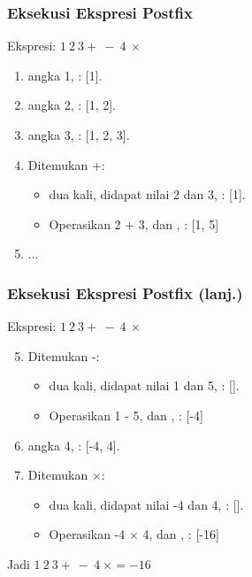 \begin{frame}
\frametitle{Eksekusi Ekspresi Postfix}
Ekspresi: $1 \ 2 \ 3 + \ - \ 4 \ \times$
\begin{enumerate}
  \item {} angka 1, : [1].
  \item {} angka 2, : [1, 2].
  \item {} angka 3, : [1, 2, 3].
  \item Ditemukan +:
  \begin{itemize}
    \item {} dua kali, didapat nilai 2 dan 3, : [1].
    \item Operasikan 2 + 3, dan , : [1, 5]
  \end{itemize}
  \item ...
\end{enumerate}
\end{frame}

\begin{frame}
\frametitle{Eksekusi Ekspresi Postfix (lanj.)}
Ekspresi: $1 \ 2 \ 3 + \ - \ 4 \ \times$
\begin{enumerate}
  \setcounter{enumi}{4}
  \item Ditemukan -:
  \begin{itemize}
    \item {} dua kali, didapat nilai 1 dan 5, : [].
    \item Operasikan 1 - 5, dan , : [-4]
  \end{itemize}
  \item {} angka 4, : [-4, 4].
  \item Ditemukan $\times$:
  \begin{itemize}
    \item {} dua kali, didapat nilai -4 dan 4, : [].
    \item Operasikan -4 $\times$ 4, dan , : [-16]
    \newline
  \end{itemize}
\end{enumerate}

Jadi  $1 \ 2 \ 3 + \ - \ 4 \ \times = -16$
\end{frame}

